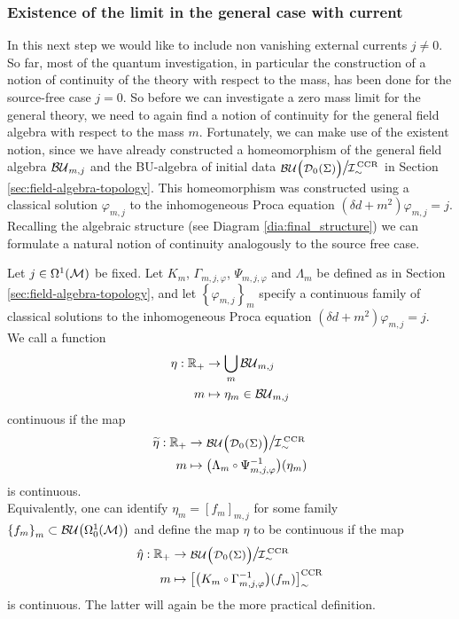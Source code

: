 \subsubsection{Existence of the limit in the general case with current}\label{sec:mass-dependence-j-general}
In this next step we would like to include non vanishing external currents $j \neq 0$. So far, most of the quantum investigation, in particular the construction of a notion of continuity of the theory with respect to the mass, has been done for the source-free case $j = 0$. So before we can investigate a zero mass limit for the general theory, we need to again find a notion of continuity for the general field algebra with respect to the mass $m$. Fortunately, we can make use of the existent notion, since we have already constructed a homeomorphism of the general field algebra ${\mathcal{BU}_{m,j}}$ and the BU-algebra of initial data $\Quotientscale{\BU\big(\Dzs\big)}{\ICCR}$ in Section \ref{sec:field-algebra-topology}. This homeomorphism was constructed using a classical solution $\varphi_{m,j}$ to the inhomogeneous Proca equation $(\delta d + m^2) \varphi_{m,j} = j$. Recalling the algebraic structure (see Diagram \ref{dia:final_structure}) we can formulate a natural notion of continuity analogously to the source free case.
\begin{definition}\label{def:field_continuity_general}
	Let $j \in \Omega^1(\mathcal{M})$ be fixed. Let $K_m$, $\Gamma_{m,j,\varphi}$, $\Psi_{m,j,\varphi}$ and $\Lambda_{m}$ be defined as  in Section \ref{sec:field-algebra-topology}, and let $\left\{ \varphi_{m,j} \right\}_m$ specify a continuous family of classical solutions to the inhomogeneous Proca equation $(\delta d + m^2) \varphi_{m,j} = j$.\\
	We call a function
	\begin{align}
	\eta : \mathbb{R}_+ &\to \bigcup_m {\mathcal{BU}_{m,j}}\\
	m &\mapsto \eta_m  \in {\mathcal{BU}_{m,j}}\notag
	\end{align}
	continuous if the map
	\begin{align}
	\widetilde{\eta} : \IR_+ &\to {\Quotientscale{\BU\big( \Dzs \big) }{\ICCR}} \\
	m &\mapsto \big( \Lambda_m \comp  \Psi_{m,j,\varphi}^{-1} \big) (\eta_m)\notag
	\end{align}
	is continuous.\\
	Equivalently, one can identify $\eta_m = [f_m]_{m,j}$ for some family $\left\{ f_m \right\}_m \subset {\mathcal{BU}\big(\Omega^1_0(\ensuremath{\mathcal{M}})\big)}$ and define the map $\eta$ to be continuous if the map
	\begin{align}
	\hat{\eta} : \IR_+ &\to {\Quotientscale{\BU\big( \Dzs \big) }{\ICCR}} \\
	m &\mapsto \big[  \big( K_m \comp  \Gamma_{m,j,\varphi}^{-1} \big) (f_m) \big]_\sim^\text{CCR}\notag
	\end{align}
	is continuous. The latter will again be the more practical definition.
\end{definition}
